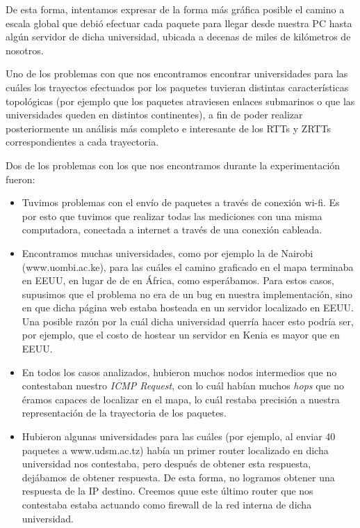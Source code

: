 \documentclass[final,inline,a4paper,narroweqnarray]{ieee}
\begin{document}
De esta forma, intentamos expresar de la forma más gráfica posible el camino a
escala global que debió efectuar cada paquete para llegar desde nuestra PC hasta
algún servidor de dicha universidad, ubicada a decenas de miles de kilómetros de
nosotros.

Uno de los problemas con que nos encontramos encontrar universidades para las
cuáles los trayectos efectuados por los paquetes tuvieran distintas
características topológicas (por ejemplo que los paquetes atraviesen enlaces
submarinos o que las universidades queden en distintos continentes), a fin de
poder realizar posteriormente un análisis más completo e interesante de los RTTs
y ZRTTs correspondientes a cada trayectoria.

Dos de los problemas con los que nos encontramos durante la experimentación fueron:
\begin{itemize}
	
  \item Tuvimos problemas con el envío de paquetes a través de conexión wi-fi.
  Es por esto que tuvimos que realizar todas las mediciones con una misma
  computadora, conectada a internet a través de una conexión cableada.
	
  \item Encontramos muchas universidades, como por ejemplo la de Nairobi
  (www.uombi.ac.ke), para las cuáles el camino graficado en el mapa terminaba en
  EEUU, en lugar de de en África, como esperábamos. Para estos casos, supusimos
  que el problema no era de un bug en nuestra implementación, sino en que dicha
  página web estaba hosteada en un servidor localizado en EEUU. Una posible
  razón por la cuál dicha universidad querría hacer esto podría ser, por
  ejemplo, que el costo de hostear un servidor en Kenia es mayor que en EEUU.
	
  \item En todos los casos analizados, hubieron muchos nodos intermedios que no
  contestaban nuestro \emph{ICMP Request}, con lo cuál habían muchos \emph{hops}
  que no éramos capaces de localizar en el mapa, lo cuál restaba precisión a
  nuestra representación de la trayectoria de los paquetes.
	
  \item Hubieron algunas universidades para las cuáles (por ejemplo, al enviar
  40 paquetes a www.udsm.ac.tz) había un primer router localizado en dicha
  universidad nos contestaba, pero después de obtener esta respuesta, dejábamos
  de obtener respuesta. De esta forma, no logramos obtener una respuesta de la
  IP destino. Creemos quue este último router que nos contestaba estaba actuando
  como firewall de la red interna de dicha universidad.

\end{itemize}
\end{document}
